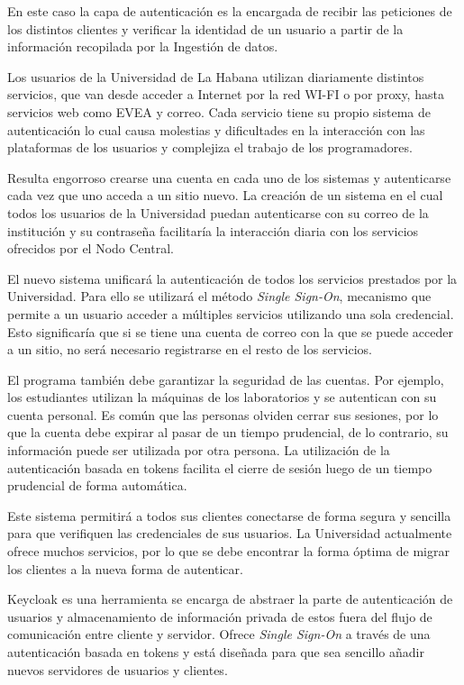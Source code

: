 En este caso la capa de autenticación es la encargada de recibir las peticiones de los distintos clientes y verificar la identidad de un usuario a partir de la información recopilada por la Ingestión de datos.

Los usuarios de la Universidad de La Habana  utilizan diariamente distintos servicios, que van desde acceder a Internet por la red WI-FI o por proxy, hasta servicios web como EVEA y correo. Cada servicio tiene su propio sistema de autenticación lo cual causa molestias y dificultades en la interacción con las plataformas de los usuarios y complejiza el trabajo de los programadores.

Resulta engorroso crearse una cuenta en cada uno de los sistemas y autenticarse cada vez que uno acceda a un sitio nuevo. La creación de un sistema en el cual todos los usuarios de la Universidad puedan autenticarse con su correo de la institución y su contraseña facilitaría la interacción diaria con los servicios ofrecidos por el Nodo Central.

El nuevo sistema unificará la autenticación de todos los servicios prestados por la Universidad. Para ello se utilizará el método \textit{Single Sign-On}, mecanismo que permite a un usuario acceder a múltiples servicios utilizando una sola credencial. Esto significaría que si se tiene una cuenta de correo con la que se puede acceder a un sitio, no será necesario registrarse en el resto de los servicios.


El programa también debe garantizar la seguridad de las cuentas. Por ejemplo, los estudiantes utilizan la máquinas de los laboratorios y se autentican con su cuenta personal. Es común que las personas olviden cerrar sus sesiones, por lo que la cuenta debe expirar al pasar de un tiempo prudencial, de lo contrario, su información puede ser utilizada por otra persona. La utilización de la autenticación basada en tokens facilita el cierre de sesión luego de un tiempo prudencial de forma automática.

Este sistema permitirá a todos sus clientes conectarse de forma segura y sencilla para que verifiquen las credenciales de sus usuarios. La Universidad actualmente ofrece muchos servicios, por lo que se debe encontrar la forma óptima de migrar los clientes a la nueva forma de autenticar.

Keycloak es una herramienta se encarga de abstraer la parte de autenticación de usuarios y almacenamiento de información privada de estos fuera del flujo de comunicación entre cliente y servidor. Ofrece \textit{Single Sign-On} a través de una autenticación basada en tokens y está diseñada para que sea sencillo añadir nuevos servidores de usuarios y clientes.

